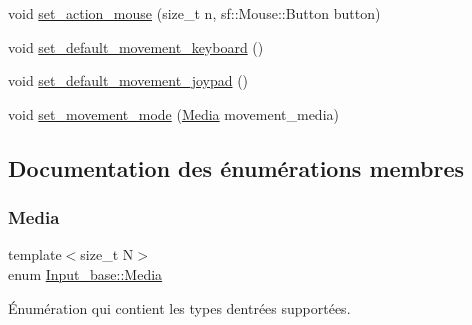 \begin{DoxyCompactItemize}
void \hyperlink{class_input__base_aa5600e81056832d37167aec2ff0034a4}{set\+\_\+action\+\_\+mouse} (size\+\_\+t n, sf\+::\+Mouse\+::\+Button button)
\item 
void \hyperlink{class_input__base_ae4092ec083ca10480a0fd61301b336f1}{set\+\_\+default\+\_\+movement\+\_\+keyboard} ()
\item 
void \hyperlink{class_input__base_a50d1a01cf671110d8b73c7b48b18095f}{set\+\_\+default\+\_\+movement\+\_\+joypad} ()
\item 
void \hyperlink{class_input__base_a103633f42d3fa58352a12b54ed4b3faf}{set\+\_\+movement\+\_\+mode} (\hyperlink{class_input__base_a455585e7933485981b3d7bfcad3a47c6}{Media} movement\+\_\+media)
\end{DoxyCompactItemize}


\subsection{Documentation des énumérations membres}
\mbox{\label{class_input__base_a455585e7933485981b3d7bfcad3a47c6}} 
\subsubsection{\texorpdfstring{Media}{Media}}
{\footnotesize\ttfamily template$<$size\+\_\+t N$>$ \\
enum \hyperlink{class_input__base_a455585e7933485981b3d7bfcad3a47c6}{Input\+\_\+base\+::\+Media}\hspace{0.3cm}{\ttfamily [strong]}}



Énumération qui contient les types d\textquotesingle{}entrées supportées. 

